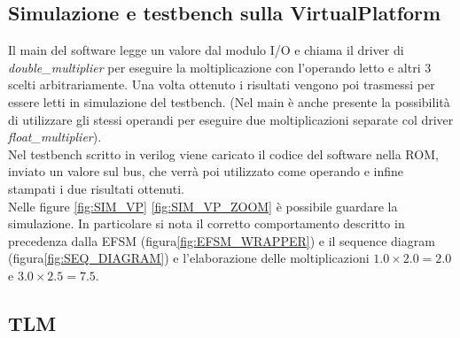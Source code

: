 \documentclass[]{IEEEtran}
\begin{document}
\subsection{Simulazione e testbench sulla VirtualPlatform}
Il main del software legge un valore dal modulo I/O e chiama il driver di \textit{double\_multiplier} per eseguire la moltiplicazione con l'operando letto e altri 3 scelti arbitrariamente. Una volta ottenuto i risultati vengono poi trasmessi per essere letti in simulazione del testbench. (Nel main è anche presente la possibilità di utilizzare gli stessi operandi per eseguire due moltiplicazioni separate col driver \textit{float\_multiplier}).
\\Nel testbench scritto in verilog viene caricato il codice del software nella ROM, inviato un valore sul bus, che verrà poi utilizzato come operando e infine stampati i due risultati ottenuti. 
\\Nelle figure \ref{fig:SIM_VP} \ref{fig:SIM_VP_ZOOM} è possibile guardare la simulazione. In particolare si nota il corretto comportamento descritto in precedenza dalla EFSM (figura\ref{fig:EFSM_WRAPPER}) e il sequence diagram (figura\ref{fig:SEQ_DIAGRAM}) e l'elaborazione delle moltiplicazioni $1.0 \times  2.0 = 2.0$ e $3.0 \times 2.5 = 7.5$.

\subsection{TLM}
\end{document}
